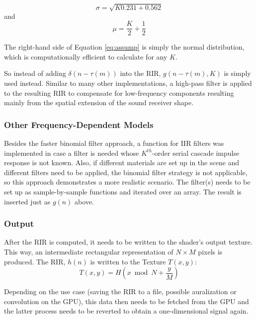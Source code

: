 \documentclass[twoside,a4paper]{article}
\begin{document}
\begin{equation}
\sigma = \sqrt{K 0.231 + 0.562}
\end{equation}
and 
\begin{equation}
\mu = \frac{K}{2} + \frac{1}{2}
\end{equation}

The right-hand side of Equation \ref{eq:assump} is simply the normal distribution, which is computationally efficient to calculate for any $K$.

So instead of adding $\delta(n-\tau(m))$ into the RIR, $g(n-\tau(m),K)$ is simply used instead. 
Similar to many other implementations, a high-pass filter is applied to the resulting RIR to compensate for low-frequency components resulting mainly from the spatial extension of the sound receiver shape.

\subsubsection*{Other Frequency-Dependent Models}
Besides the faster binomial filter approach, a function for IIR filters was implemented in case a filter is needed whose $K^{th}$-order serial cascade impulse response is not known. Also, if different materials are set up in the scene and different filters need to be applied, the binomial filter strategy is not applicable, so this approach demonstrates a more realistic scenario. The filter(s) needs to be set up as sample-by-sample functions and iterated over an array. The result is inserted just as $g(n)$ above.

\subsubsection*{Output}
After the RIR is computed, it needs to be written to the shader's output texture. This way, an intermediate rectangular representation of $N \times M$ pixels is produced. The RIR, $h(n)$ is written to the Texture $T(x,y)$:
\begin{equation}
  T(x,y) = H(x \bmod N+\frac{y}{M})
\end{equation}

Depending on the use case (saving the RIR to a file, possible auralization or convolution on the GPU), this data then needs to be fetched from the GPU and the latter process needs to be reverted to obtain a one-dimensional signal again.
\end{document}
